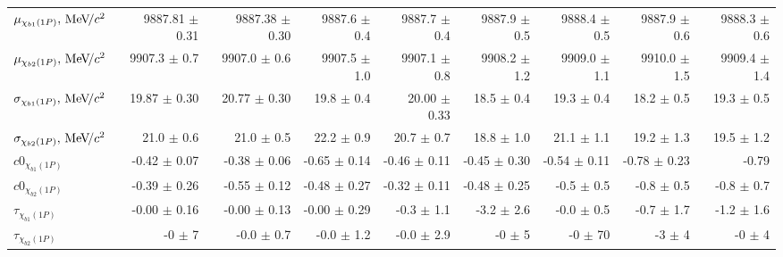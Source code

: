 \begin{table}[H]
{{\begin{tabular}{lrrrrrrrr}
\rule{0pt}{4ex}$\mu_{\chi_{b1}(1P)}, {\mathrm{\,Me\kern -0.1em V\!/}c^2}$ & 9887.81 $\pm$ 0.31 & 9887.38 $\pm$ 0.30 & 9887.6 $\pm$ 0.4 & 9887.7 $\pm$ 0.4 & 9887.9 $\pm$ 0.5 & 9888.4 $\pm$ 0.5 & 9887.9 $\pm$ 0.6 & 9888.3 $\pm$ 0.6\\
$\mu_{\chi_{b2}(1P)}, {\mathrm{\,Me\kern -0.1em V\!/}c^2}$ & 9907.3 $\pm$ 0.7 & 9907.0 $\pm$ 0.6 & 9907.5 $\pm$ 1.0 & 9907.1 $\pm$ 0.8 & 9908.2 $\pm$ 1.2 & 9909.0 $\pm$ 1.1 & 9910.0 $\pm$ 1.5 & 9909.4 $\pm$ 1.4\\

\rule{0pt}{4ex}$\sigma_{\chi_{b1}(1P)}, {\mathrm{\,Me\kern -0.1em V\!/}c^2}$ & 19.87 $\pm$ 0.30 & 20.77 $\pm$ 0.30 & 19.8 $\pm$ 0.4 & 20.00 $\pm$ 0.33 & 18.5 $\pm$ 0.4 & 19.3 $\pm$ 0.4 & 18.2 $\pm$ 0.5 & 19.3 $\pm$ 0.5\\
$\sigma_{\chi_{b2}(1P)}, {\mathrm{\,Me\kern -0.1em V\!/}c^2}$ & 21.0 $\pm$ 0.6 & 21.0 $\pm$ 0.5 & 22.2 $\pm$ 0.9 & 20.7 $\pm$ 0.7 & 18.8 $\pm$ 1.0 & 21.1 $\pm$ 1.1 & 19.2 $\pm$ 1.3 & 19.5 $\pm$ 1.2\\

\rule{0pt}{4ex}$c0_{\chi_{b1}(1P)}$ & -0.42 $\pm$ 0.07 & -0.38 $\pm$ 0.06 & -0.65 $\pm$ 0.14 & -0.46 $\pm$ 0.11 & -0.45 $\pm$ 0.30 & -0.54 $\pm$ 0.11 & -0.78 $\pm$ 0.23 & -0.79\\
$c0_{\chi_{b2}(1P)}$ & -0.39 $\pm$ 0.26 & -0.55 $\pm$ 0.12 & -0.48 $\pm$ 0.27 & -0.32 $\pm$ 0.11 & -0.48 $\pm$ 0.25 & -0.5 $\pm$ 0.5 & -0.8 $\pm$ 0.5 & -0.8 $\pm$ 0.7\\

\rule{0pt}{4ex}$\tau_{\chi_{b1}(1P)}$ & -0.00 $\pm$ 0.16 & -0.00 $\pm$ 0.13 & -0.00 $\pm$ 0.29 & -0.3 $\pm$ 1.1 & -3.2 $\pm$ 2.6 & -0.0 $\pm$ 0.5 & -0.7 $\pm$ 1.7 & -1.2 $\pm$ 1.6\\
$\tau_{\chi_{b2}(1P)}$ & -0 $\pm$ 7 & -0.0 $\pm$ 0.7 & -0.0 $\pm$ 1.2 & -0.0 $\pm$ 2.9 & -0 $\pm$ 5 & -0 $\pm$ 70 & -3 $\pm$ 4 & -0 $\pm$ 4\\
\bottomrule
\end{tabular}
} %

} %
\end{table}
